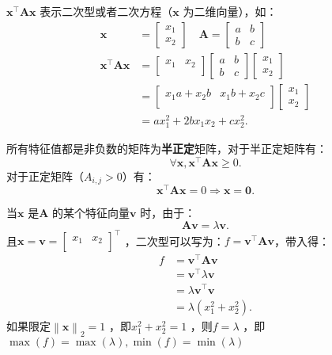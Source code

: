 \begin{notation}
    $\bm{x}^\top \bm{Ax}$ 表示二次型或者二次方程（$\bm{x}$ 为二维向量），如：
    \begin{align*}
        \bm{x} &=\begin{bmatrix}
            x_1\\
            x_2
        \end{bmatrix}\quad \bm{A}=\begin{bmatrix}
        a & b\\
        b & c
        \end{bmatrix}\\
        \bm{x}^\top \bm{Ax}&= \begin{bmatrix}
            x_1 & x_2\\
        \end{bmatrix}\begin{bmatrix}
            a & b\\
            b & c
        \end{bmatrix}\begin{bmatrix}
            x_1\\
            x_2
        \end{bmatrix} \\
        &= \begin{bmatrix}
            x_1a+x_2b & x_1b+x_2c\\
        \end{bmatrix}\begin{bmatrix}
            x_1\\
            x_2
        \end{bmatrix} \\
        &= ax_1^2 +2bx_1x_2+cx_2^2
    .\end{align*}
\end{notation}
\begin{defi}
    所有特征值都是非负数的矩阵为\textbf{半正定}矩阵，对于半正定矩阵有：\[
        \forall \bm{x},\bm{x}^\top \bm{A}\bm{x}\ge 0
    .\]
    对于正定矩阵（$A_{i,j}>0$）有：\[
        \bm{x}^\top \bm{Ax}=0\Rightarrow \bm{x}=\bm{0}
    .\]
\end{defi}
\begin{notation}
    当$\bm{x}$ 是$\bm{A}$ 的某个特征向量$\bm{v}$ 时，由于：\[
        \bm{Av}=\lambda\bm{v}
    .\]
    且$\bm{x}=\bm{v}=\begin{bmatrix}
        x_1 & x_2\\
    \end{bmatrix}^\top $ ，二次型可以写为：$f=\bm{v}^\top \bm{Av}$，带入得：
    \begin{align*}
        f&= \bm{v}^\top \bm{Av} \\
        &= \bm{v}^\top \lambda\bm{v} \\
        &= \lambda\bm{v}^\top \bm{v} \\
        &= \lambda\left( x_1^2 +x_2^2  \right)
    .\end{align*}
    如果限定$\left\lVert \bm{x} \right\rVert_{2}=1$ ，即$x_1^2 +x_2^2 =1$ ，则$f=\lambda$ ，即$\max\left( f \right)=\max\left( \lambda \right),\min\left( f \right)=\min\left( \lambda \right)$
\end{notation}
